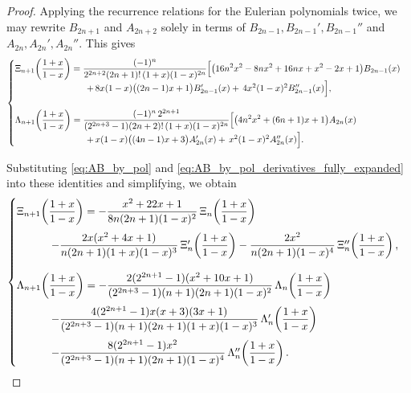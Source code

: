 \documentclass[11pt,twoside]{article}
\numberwithin{equation}{section}
\begin{document}
\begin{proof}
Applying the recurrence relations for the Eulerian polynomials twice, we may rewrite \(B_{2n+1}\) and \(A_{2n+2}\) solely in terms of \(B_{2n-1},B_{2n-1}',B_{2n-1}''\) and \(A_{2n},A_{2n}',A_{2n}''\). This gives
\begin{equation*}
\begin{cases}
\displaystyle
\Xi_{n+1}\!\left(\dfrac{1+x}{1-x}\right)
=
\dfrac{(-1)^n}{2^{2n+2}(2n+1)!\,(1+x)(1-x)^{2n}}
\Bigl[
\bigl(16n^2x^2-8nx^2+16nx+x^2-2x+1\bigr)B_{2n-1}(x)
\\[0.6em]\hspace{8em}
+\,8x(1-x)\bigl((2n-1)x+1\bigr)B_{2n-1}'(x)
+\,4x^2(1-x)^2B_{2n-1}''(x)
\Bigr],\\[1.6em]
\displaystyle
\Lambda_{n+1}\!\left(\dfrac{1+x}{1-x}\right)
=
\dfrac{(-1)^n\,2^{2n+1}}{(2^{2n+3}-1)(2n+2)!\,(1+x)(1-x)^{2n}}
\Bigl[
\bigl(4n^2x^2+(6n+1)x+1\bigr)A_{2n}(x)
\\[0.6em]\hspace{8em}
+\,x(1-x)\bigl((4n-1)x+3\bigr)A_{2n}'(x)
+\,x^2(1-x)^2A_{2n}''(x)
\Bigr].
\end{cases}
\end{equation*}

Substituting \eqref{eq:AB_by_pol} and \eqref{eq:AB_by_pol_derivatives_fully_expanded} into these identities and simplifying, we obtain
\begin{equation*}
\begin{cases}
\displaystyle
\Xi_{n+1}\!\left(\dfrac{1+x}{1-x}\right)
=
-\dfrac{x^2+22x+1}{8n(2n+1)(1-x)^2}\,
\Xi_n\!\left(\dfrac{1+x}{1-x}\right)
\\[1.2em]\hspace{3.2em}
-\dfrac{2x(x^2+4x+1)}{n(2n+1)(1+x)(1-x)^3}\,
\Xi_n'\!\left(\dfrac{1+x}{1-x}\right)
-\dfrac{2x^2}{n(2n+1)(1-x)^4}\,
\Xi_n''\!\left(\dfrac{1+x}{1-x}\right),
\\[1.8em]
\displaystyle
\Lambda_{n+1}\!\left(\dfrac{1+x}{1-x}\right)
=
-\dfrac{2(2^{2n+1}-1)(x^2+10x+1)}{(2^{2n+3}-1)(n+1)(2n+1)(1-x)^2}\,
\Lambda_n\!\left(\dfrac{1+x}{1-x}\right)
\\[1.2em]\hspace{3.2em}
-\dfrac{4(2^{2n+1}-1)x(x+3)(3x+1)}{(2^{2n+3}-1)(n+1)(2n+1)(1+x)(1-x)^3}\,
\Lambda_n'\!\left(\dfrac{1+x}{1-x}\right)
\\[1.2em]\hspace{3.2em}
-\dfrac{8(2^{2n+1}-1)x^2}{(2^{2n+3}-1)(n+1)(2n+1)(1-x)^4}\,
\Lambda_n''\!\left(\dfrac{1+x}{1-x}\right).
\end{cases}
\end{equation*}


\end{proof}
\end{document}
